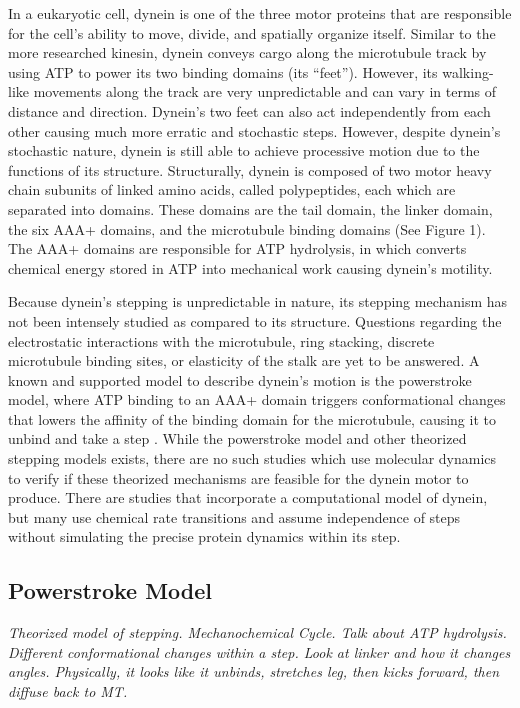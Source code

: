 In a eukaryotic cell, dynein is one of the three motor proteins that are responsible for the cell’s ability to move, divide, and spatially organize itself. Similar to the more researched kinesin, dynein conveys cargo along the microtubule track by using ATP to power its two binding domains (its “feet”). However, its walking-like movements along the track are very unpredictable and can vary in terms of distance and direction. Dynein’s two feet can also act independently from each other causing much more erratic and stochastic steps. However, despite dynein’s stochastic nature, dynein is still able to achieve processive motion due to the functions of its structure. Structurally, dynein is composed of two motor heavy chain subunits of linked amino acids, called polypeptides, each which are separated into domains. These domains are the tail domain, the linker domain, the six AAA+ domains, and the microtubule binding domains (See Figure 1). The AAA+ domains are responsible for ATP hydrolysis, in which converts chemical energy stored in ATP into mechanical work causing dynein’s motility. 

Because dynein’s stepping is unpredictable in nature, its stepping mechanism has not been intensely studied as compared to its structure. Questions regarding the electrostatic interactions with the microtubule, ring stacking, discrete microtubule binding sites, or elasticity of the stalk are yet to be answered. A known and supported model to describe dynein’s motion is the powerstroke model, where ATP binding to an AAA+ domain triggers conformational changes that lowers the affinity of the binding domain for the microtubule, causing it to unbind and take a step . While the powerstroke model and other theorized stepping models exists, there are no such studies which use molecular dynamics to verify if these theorized mechanisms are feasible for the dynein motor to produce. There are studies that incorporate a computational model of dynein, but many use chemical rate transitions and assume independence of steps without simulating the precise protein dynamics within its step.




\subsection{Powerstroke Model}
\textit{Theorized model of stepping. Mechanochemical Cycle. Talk about ATP hydrolysis. Different conformational changes within a step. Look at linker and how it changes angles. Physically, it looks like it unbinds, stretches leg, then kicks forward, then diffuse back to MT.} 

